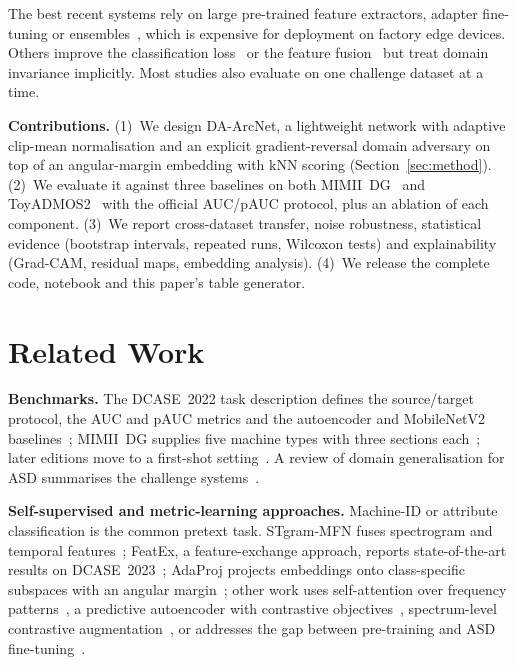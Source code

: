 \documentclass[conference]{IEEEtran}
\begin{document}
The best recent systems rely on large pre-trained feature extractors, adapter fine-tuning or ensembles~\cite{saengthong2024genrep,zheng2024lora,han2025ssam}, which is expensive for deployment on factory edge devices. Others improve the classification loss~\cite{wilkinghoff2024adaproj} or the feature fusion~\cite{liu2022stgram,wilkinghoff2023ssl} but treat domain invariance implicitly. Most studies also evaluate on one challenge dataset at a time.

\textbf{Contributions.} (1)~We design DA-ArcNet, a lightweight network with adaptive clip-mean normalisation and an explicit gradient-reversal domain adversary on top of an angular-margin embedding with kNN scoring (Section~\ref{sec:method}). (2)~We evaluate it against three baselines on both MIMII~DG~\cite{dohi2022mimiidg} and ToyADMOS2~\cite{harada2021toyadmos2} with the official AUC/pAUC protocol, plus an ablation of each component. (3)~We report cross-dataset transfer, noise robustness, statistical evidence (bootstrap intervals, repeated runs, Wilcoxon tests) and explainability (Grad-CAM, residual maps, embedding analysis). (4)~We release the complete code, notebook and this paper's table generator.

\section{Related Work}
\textbf{Benchmarks.} The DCASE~2022 task description defines the source/target protocol, the AUC and pAUC metrics and the autoencoder and MobileNetV2 baselines~\cite{dohi2022dcase}; MIMII~DG supplies five machine types with three sections each~\cite{dohi2022mimiidg}; later editions move to a first-shot setting~\cite{dohi2023dcase,nishida2024dcase,nishida2025dcase}. A review of domain generalisation for ASD summarises the challenge systems~\cite{wilkinghoff2025review}.

\textbf{Self-supervised and metric-learning approaches.} Machine-ID or attribute classification is the common pretext task. STgram-MFN fuses spectrogram and temporal features~\cite{liu2022stgram}; FeatEx, a feature-exchange approach, reports state-of-the-art results on DCASE~2023~\cite{wilkinghoff2023ssl}; AdaProj projects embeddings onto class-specific subspaces with an angular margin~\cite{wilkinghoff2024adaproj}; other work uses self-attention over frequency patterns~\cite{zhang2023selfattn}, a predictive autoencoder with contrastive objectives~\cite{zeng2023geco}, spectrum-level contrastive augmentation~\cite{meng2024contrastive}, or addresses the gap between pre-training and ASD fine-tuning~\cite{jiang2024anopatch}.
\end{document}
